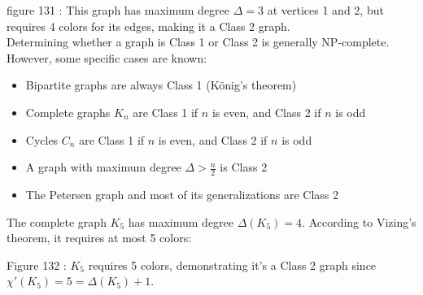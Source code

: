 \documentclass{article}
\theoremstyle{definition}
\begin{document}
\small figure 131 : This graph has maximum degree $\Delta = 3$ at vertices 1 and 2, but requires 4 colors for its edges, making it a Class 2 graph.
\\

Determining whether a graph is Class 1 or Class 2 is generally NP-complete. However, some specific cases are known:

\begin{itemize}
    \item Bipartite graphs are always Class 1 (König's theorem)
    \item Complete graphs $K_n$ are Class 1 if $n$ is even, and Class 2 if $n$ is odd
    \item Cycles $C_n$ are Class 1 if $n$ is even, and Class 2 if $n$ is odd
    \item A graph with maximum degree $\Delta > \frac{n}{2}$ is Class 2
    \item The Petersen graph and most of its generalizations are Class 2
\end{itemize}

The complete graph $K_5$ has maximum degree $\Delta(K_5) = 4$. According to Vizing's theorem, it requires at most 5 colors:

\begin{center}
\end{center}

\small Figure 132 : $K_5$ requires 5 colors, demonstrating it's a Class 2 graph since $\chi'(K_5) = 5 = \Delta(K_5) + 1$.

\pagebreak
\newpage
\clearpage
\end{document}
